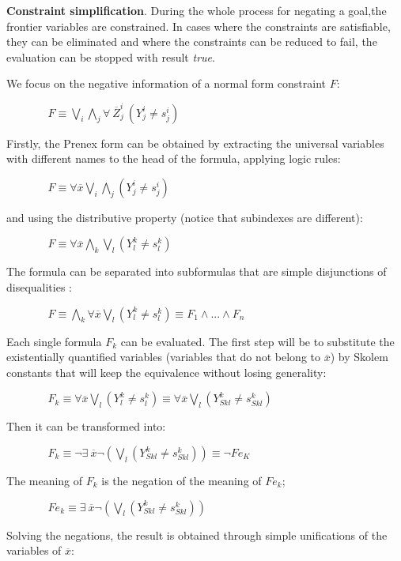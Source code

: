 \documentclass{tlp}
\begin{document}
\noindent
{\bf Constraint simplification}. During the whole process for negating
a goal,the frontier variables are constrained. In cases where the
constraints are satisfiable, they can be eliminated and where the
constraints can be reduced to fail, the evaluation can be stopped with
result \emph{true}.
 
We focus on the negative information of a normal form constraint $F$:

$~~~~~~~~~~~~~~~~~ F \equiv  \bigvee_i\bigwedge_j \forall~ \overline{Z}_j^i~(Y_j^i \neq s_j^i)$

Firstly, the Prenex form \cite{Shoenfield} can be obtained by
extracting the universal variables with different names to the head of
the formula, applying logic rules:

$~~~~~~~~~~~~~~~~~ F \equiv \forall \overline{x} \bigvee_i\bigwedge_j (Y_j^i \neq s_j^i) $

\noindent
and using the distributive property (notice that subindexes are different):

$~~~~~~~~~~~~~~~~~ F \equiv \forall \overline{x} \bigwedge_k\bigvee_l (Y_l^k \neq s_l^k) $

The formula can be separated into subformulas that are simple
disjunctions of disequalities :

 $~~~~~~~~~~~~~~~~~ F \equiv \bigwedge_k \forall \overline{x} \bigvee_l (Y_l^k \neq s_l^k) \equiv F_1 \wedge ... \wedge F_n$

Each single formula $F_k$ can be evaluated. The first step will be to
substitute the existentially quantified variables (variables that do not
belong to $\overline{x}$) by Skolem constants that will keep
the equivalence without losing generality:

$~~~~~~~~~~~~~~~~~  F_k \equiv \forall \overline{x} \bigvee_l ( Y_l^k \neq s_l^k ) \equiv \forall \overline{x} \bigvee_l ( Y_{Sk l}^k \neq s_{Sk l}^k )  $

Then it can be transformed into:

$~~~~~~~~~~~~~~~~~ F_k \equiv  \neg \exists ~ \overline{x} \neg ( \bigvee_l (Y_{Sk l}^k \neq s_{Sk l}^k) ) \equiv \neg Fe_K $

The meaning of $F_k$ is the negation of the meaning of $Fe_k$;

$~~~~~~~~~~~~~~~~~ Fe_k \equiv \exists ~ \overline{x} \neg ( \bigvee_l (Y_{Sk l}^k \neq s_{Sk l}^k)) $
 
Solving the negations, the result is obtained through simple unifications of the variables of $\overline{x}$:
\end{document}
